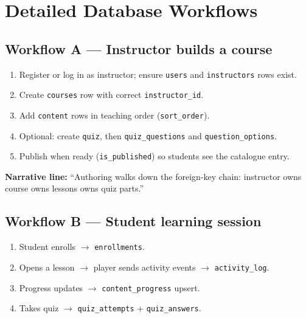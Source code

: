 
\chapter{Detailed Database Workflows}
\label{ch:workflows}

\section{Workflow A --- Instructor builds a course}
\begin{enumerate}[leftmargin=*]
  \item Register or log in as instructor; ensure \texttt{users} and \texttt{instructors} rows exist.

  \item Create \texttt{courses} row with correct \texttt{instructor\_id}.

  \item Add \texttt{content} rows in teaching order (\texttt{sort\_order}).

  \item Optional: create \texttt{quiz}, then \texttt{quiz\_questions} and \texttt{question\_options}.

  \item Publish when ready (\texttt{is\_published}) so students see the catalogue entry.
\end{enumerate}

\textbf{Narrative line:} ``Authoring walks down the foreign-key chain: instructor owns course owns lessons owns quiz parts.''

\section{Workflow B --- Student learning session}
\begin{enumerate}[leftmargin=*]
  \item Student enrolls $\rightarrow$ \texttt{enrollments}.

  \item Opens a lesson $\rightarrow$ player sends activity events $\rightarrow$ \texttt{activity\_log}.

  \item Progress updates $\rightarrow$ \texttt{content\_progress} upsert.

  \item Takes quiz $\rightarrow$ \texttt{quiz\_attempts} + \texttt{quiz\_answers}.

\end{enumerate}

